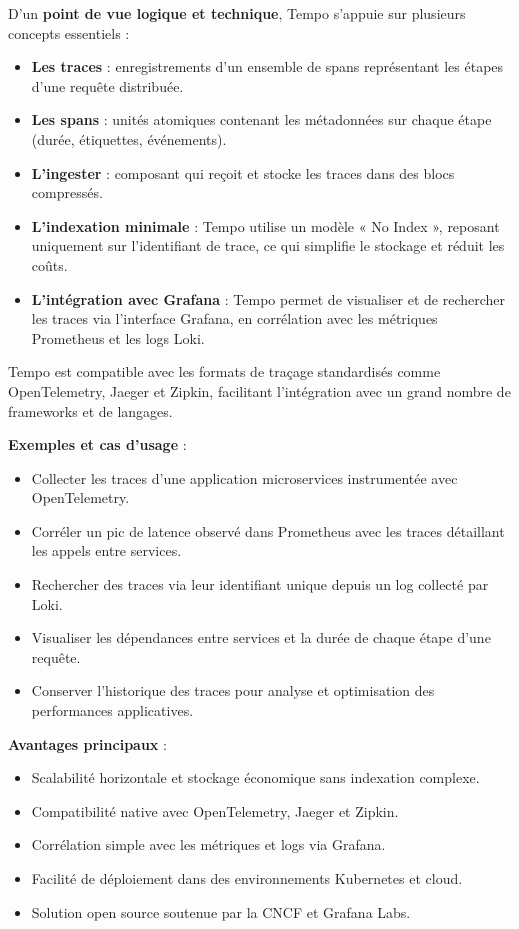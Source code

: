 D’un \textbf{point de vue logique et technique}, Tempo s’appuie sur plusieurs concepts essentiels  :
\begin{itemize}
	\item \textbf{Les traces}  : enregistrements d’un ensemble de spans représentant les étapes d’une requête distribuée.
	\item \textbf{Les spans}  : unités atomiques contenant les métadonnées sur chaque étape (durée, étiquettes, événements).
	\item \textbf{L’ingester}  : composant qui reçoit et stocke les traces dans des blocs compressés.
	\item \textbf{L’indexation minimale}  : Tempo utilise un modèle «  No Index  », reposant uniquement sur l’identifiant de trace, ce qui simplifie le stockage et réduit les coûts.
	\item \textbf{L’intégration avec Grafana}  : Tempo permet de visualiser et de rechercher les traces via l’interface Grafana, en corrélation avec les métriques Prometheus et les logs Loki.
\end{itemize}

Tempo est compatible avec les formats de traçage standardisés comme OpenTelemetry, Jaeger et Zipkin, facilitant l’intégration avec un grand nombre de frameworks et de langages.

\textbf{Exemples et cas d’usage} :
\begin{itemize}
	\item Collecter les traces d’une application microservices instrumentée avec OpenTelemetry.
	\item Corréler un pic de latence observé dans Prometheus avec les traces détaillant les appels entre services.
	\item Rechercher des traces via leur identifiant unique depuis un log collecté par Loki.
	\item Visualiser les dépendances entre services et la durée de chaque étape d’une requête.
	\item Conserver l’historique des traces pour analyse et optimisation des performances applicatives.
\end{itemize}

\textbf{Avantages principaux} :
\begin{itemize}
	\item Scalabilité horizontale et stockage économique sans indexation complexe.
	\item Compatibilité native avec OpenTelemetry, Jaeger et Zipkin.
	\item Corrélation simple avec les métriques et logs via Grafana.
	\item Facilité de déploiement dans des environnements Kubernetes et cloud.
	\item Solution open source soutenue par la CNCF et Grafana Labs.
\end{itemize}

